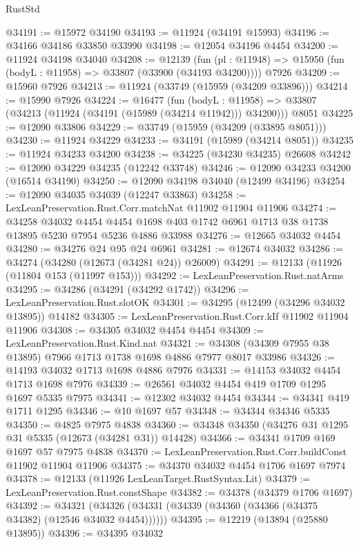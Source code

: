 \begin{lexlean}{RustStd}
\begin{coremodule}
{\begin{coremodule}
{{{{{{{{{{{{{{{{{{{{{{{{{{{{{{{{{{{{{{{{{{{{{{{{{{{{{{{{{{{{{{{{{{{{{{{{{{{{{{{{@34191 := @15972 @34190
@34193 := @11924 (@34191 @15993)
@34196 := @34166 @34186 @33850 @33990
@34198 := @12054 @34196 @4454
@34200 := @11924 @34198 @34040
@34208 := @12139
    (fun (pl : @11948) => @15950 (fun (bodyL : @11958) => @33807 (@33900 (@34193 @34200))))
    @7926
@34209 := @15960 @7926
@34213 := @11924 (@33749 (@15959 (@34209 @33896)))
@34214 := @15990 @7926
@34224 := @16477
    (fun (bodyL : @11958) => @33807 (@34213 (@11924 (@34191 (@15989 (@34214 @11942))) @34200)))
    @8051
@34225 := @12090 @33806
@34229 := @33749 (@15959 (@34209 (@33895 @8051)))
@34230 := @11924 @34229
@34233 := @34191 (@15989 (@34214 @8051))
@34235 := @11924 @34233 @34200
@34238 := @34225 (@34230 @34235) @26608
@34242 := @12090 @34229 @34235 (@12242 @33748)
@34246 := @12090 @34233 @34200 (@16514 @34190)
@34250 := @12090 @34198 @34040 (@12499 @34196)
@34254 := @12090 @34035 @34039 (@12247 @33863)
@34258 := LexLeanPreservation.Rust.Corr.matchNat @11902 @11904 @11906
@34274 := @34258
    @34032
    @4454
    @4454
    @1698
    @403
    @1742
    @6961
    @1713
    @38
    @1738
    @13895
    @5230
    @7954
    @5236
    @4886
    @33988
@34276 := @12665 @34032 @4454
@34280 := @34276 @24 @95 @24 @6961
@34281 := @12674 @34032
@34286 := @34274 (@34280 (@12673 (@34281 @24)) @26009)
@34291 := @12133 (@11926 (@11804 @153 (@11997 @153)))
@34292 := LexLeanPreservation.Rust.natArms
@34295 := @34286 (@34291 (@34292 @1742))
@34296 := LexLeanPreservation.Rust.slotOK
@34301 := @34295 (@12499 (@34296 @34032 @13895)) @14182
@34305 := LexLeanPreservation.Rust.Corr.kIf @11902 @11904 @11906
@34308 := @34305 @34032 @4454 @4454
@34309 := LexLeanPreservation.Rust.Kind.nat
@34321 := @34308 (@34309 @7955 @38 @13895) @7966 @1713 @1738 @1698 @4886 @7977 @8017 @33986
@34326 := @14193 @34032 @1713 @1698 @4886 @7976
@34331 := @14153 @34032 @4454 @1713 @1698 @7976
@34339 := @26561 @34032 @4454 @419 @1709 @1295 @1697 @5335 @7975
@34341 := @12302 @34032 @4454
@34344 := @34341 @419 @1711 @1295
@34346 := @10 @1697 @57
@34348 := @34344 @34346 @5335
@34350 := @4825 @7975 @4838
@34360 := @34348 @34350 (@34276 @31 @1295 @31 @5335 (@12673 (@34281 @31)) @14428)
@34366 := @34341 @1709 @169 @1697 @57 @7975 @4838
@34370 := LexLeanPreservation.Rust.Corr.buildConst @11902 @11904 @11906
@34375 := @34370 @34032 @4454 @1706 @1697 @7974
@34378 := @12133 (@11926 LexLeanTarget.RustSyntax.Lit)
@34379 := LexLeanPreservation.Rust.constShape
@34382 := @34378 (@34379 @1706 @1697)
@34392 := @34321 (@34326 (@34331 (@34339 (@34360 (@34366 (@34375 @34382) (@12546 @34032 @4454))))))
@34395 := @12219 (@13894 (@25880 @13895))
@34396 := @34395 @34032
}}}}}}}}}}}}}}}}}}}}}}}}}}}}}}}}}}}}}}}}}}}}}}}}}}}}}}}}}}}}}}}}}}}}}}}}}}}}}}}}
\end{coremodule}}
\end{coremodule}
\end{lexlean}
